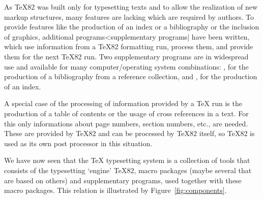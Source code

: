 As \TeX82 was built only for typesetting texts and to allow the
realization of new markup structures, many features are lacking which are
required by authors. To provide features like the production of
an index or a bibliography or the inclusion of graphics, additional
programs^^|supplementary programs| have been written, which use 
information from a \TeX82 formatting run, process them, and provide
them for the next \TeX82 run. Two supplementary programs are
in widespread use and available for many computer/operating system
combinations: \BibTeX{}, for the production of a bibliography from a
reference collection, and \MakeIndex{}, for the production of an index.

A special case of the processing of information provided by a \TeX{}
run is the production of a table of contents or the usage of cross
references in a text. For this only informations about page numbers,
section numbers, etc., are needed. These are
provided by \TeX82 and can be processed by \TeX82 itself, so \TeX82 is
used as its own post processor in this situation.

We have now seen that the \TeX{} typesetting system  is
a collection of tools that consists of the typesetting `engine' \TeX82,
macro packages (maybe several that are based on others) and
supplementary programs, used together with these macro packages.
This relation is illustrated by Figure~\ref{fig:components}.

